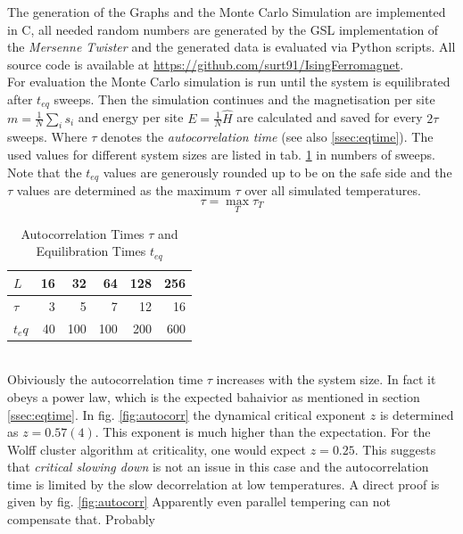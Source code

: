 The generation of the Graphs and the Monte Carlo Simulation are implemented
in C, all needed random numbers are generated by the GSL \cite{GSL}
implementation of the \emph{Mersenne Twister} \cite{Matsumoto1998} and
the generated data is evaluated via Python scripts.
All source code is available at \url{https://github.com/surt91/IsingFerromagnet}.\\

For evaluation the Monte Carlo simulation is run until the system
is equilibrated after \(t_{eq}\) sweeps. Then the simulation continues
and the magnetisation per site \(m=\frac{1}{N}\sum_i s_i\) and energy
per site \(E=\frac{1}{N}\hat H\) are calculated and saved for every
\(2\tau\) sweeps. Where \(\tau\) denotes the \emph{autocorrelation time}
(see also \ref{ssec:eqtime}). The used values for different system sizes
are listed in tab. \ref{tab:tauAndTeq} in numbers of sweeps. Note that
the \(t_{eq}\) values are generously rounded up to be on the safe side
and the \(\tau\) values are determined as the maximum \(\tau\) over all
simulated temperatures.
\[\tau = \max_T \tau_T\]
\begin{table}[htbp]
    \center
    \begin{tabular}{l r r r r r}
        \toprule
        \(L\)    & 16 &  32 &  64 & 128 & 256\\
        \midrule
        \(\tau\) &  3 &   5 &   7 &  12 &  16\\
        \(t_eq\) & 40 & 100 & 100 & 200 & 600\\
        \bottomrule
    \end{tabular}
    \caption{Autocorrelation Times $\tau$ and Equilibration Times $t_{eq}$}
    \label{tab:tauAndTeq}
\end{table}\\
Obiviously the autocorrelation time \(\tau\) increases with the system
size. In fact it obeys a power law, which is the expected bahaivior as
mentioned in section \ref{ssec:eqtime}. In fig. \ref{fig:autocorr}
the dynamical critical exponent \(z\) is determined as \(z=0.57(4)\).
This exponent is much higher than the expectation. For the Wolff cluster
algorithm at criticality, one would expect \(z=0.25\)\cite{NewmanBarkema1999}.
This suggests that \emph{critical slowing down} is not an issue in this
case and the autocorrelation time is limited by the slow decorrelation
at low temperatures. A direct proof is given by fig. \ref{fig:autocorr}
Apparently even parallel tempering can not compensate that. Probably
